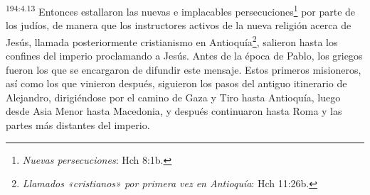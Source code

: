 \par 
\textsuperscript{194:4.13} Entonces estallaron las nuevas e implacables persecuciones\footnote{\textit{Nuevas persecuciones}: Hch 8:1b.} por parte de los judíos, de manera que los instructores activos de la nueva religión acerca de Jesús, llamada posteriormente cristianismo en Antioquía\footnote{\textit{Llamados «cristianos» por primera vez en Antioquía}: Hch 11:26b.}, salieron hasta los confines del imperio proclamando a Jesús. Antes de la época de Pablo, los griegos fueron los que se encargaron de difundir este mensaje. Estos primeros misioneros, así como los que vinieron después, siguieron los pasos del antiguo itinerario de Alejandro, dirigiéndose por el camino de Gaza y Tiro hasta Antioquía, luego desde Asia Menor hasta Macedonia, y después continuaron hasta Roma y las partes más distantes del imperio.